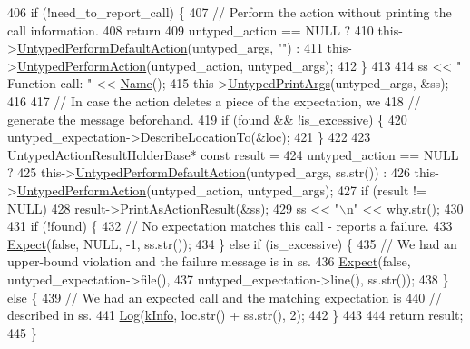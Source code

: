 \begin{DoxyCode}
406   \textcolor{keywordflow}{if} (!need\_to\_report\_call) \{
407     \textcolor{comment}{// Perform the action without printing the call information.}
408     \textcolor{keywordflow}{return}
409         untyped\_action == NULL ?
410         this->\hyperlink{classtesting_1_1internal_1_1UntypedFunctionMockerBase_a2cb149456cd559d5b0615f2310b235e3}{UntypedPerformDefaultAction}(untyped\_args, \textcolor{stringliteral}{""}) :
411         this->\hyperlink{classtesting_1_1internal_1_1UntypedFunctionMockerBase_ada5a72303863d0aa655b66338b8efea5}{UntypedPerformAction}(untyped\_action, untyped\_args);
412   \}
413 
414   ss << \textcolor{stringliteral}{"    Function call: "} << \hyperlink{classtesting_1_1internal_1_1UntypedFunctionMockerBase_ae90a5b5d48db1e99634bc6ff39ded335}{Name}();
415   this->\hyperlink{classtesting_1_1internal_1_1UntypedFunctionMockerBase_ae8c91f05fc90e66a84df49aae8de0d41}{UntypedPrintArgs}(untyped\_args, &ss);
416 
417   \textcolor{comment}{// In case the action deletes a piece of the expectation, we}
418   \textcolor{comment}{// generate the message beforehand.}
419   \textcolor{keywordflow}{if} (found && !is\_excessive) \{
420     untyped\_expectation->DescribeLocationTo(&loc);
421   \}
422 
423   UntypedActionResultHolderBase* \textcolor{keyword}{const} result =
424       untyped\_action == NULL ?
425       this->\hyperlink{classtesting_1_1internal_1_1UntypedFunctionMockerBase_a2cb149456cd559d5b0615f2310b235e3}{UntypedPerformDefaultAction}(untyped\_args, ss.str()) :
426       this->\hyperlink{classtesting_1_1internal_1_1UntypedFunctionMockerBase_ada5a72303863d0aa655b66338b8efea5}{UntypedPerformAction}(untyped\_action, untyped\_args);
427   \textcolor{keywordflow}{if} (result != NULL)
428     result->PrintAsActionResult(&ss);
429   ss << \textcolor{stringliteral}{"\(\backslash\)n"} << why.str();
430 
431   \textcolor{keywordflow}{if} (!found) \{
432     \textcolor{comment}{// No expectation matches this call - reports a failure.}
433     \hyperlink{namespacetesting_1_1internal_ab3000fc56be000e4fa6ed7cdcfee3106}{Expect}(\textcolor{keyword}{false}, NULL, -1, ss.str());
434   \} \textcolor{keywordflow}{else} \textcolor{keywordflow}{if} (is\_excessive) \{
435     \textcolor{comment}{// We had an upper-bound violation and the failure message is in ss.}
436     \hyperlink{namespacetesting_1_1internal_ab3000fc56be000e4fa6ed7cdcfee3106}{Expect}(\textcolor{keyword}{false}, untyped\_expectation->file(),
437            untyped\_expectation->line(), ss.str());
438   \} \textcolor{keywordflow}{else} \{
439     \textcolor{comment}{// We had an expected call and the matching expectation is}
440     \textcolor{comment}{// described in ss.}
441     \hyperlink{namespacetesting_1_1internal_ac0bc151763a8187d74387c4b2ba685c9}{Log}(\hyperlink{namespacetesting_1_1internal_a203d1a8a2147a53d12bbdae40d443914a396aacfaee2849eaab7c1de9773d624d}{kInfo}, loc.str() + ss.str(), 2);
442   \}
443 
444   \textcolor{keywordflow}{return} result;
445 \}
\end{DoxyCode}
